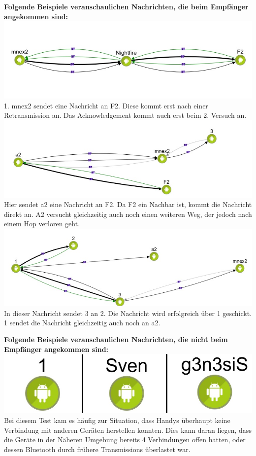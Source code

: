 \textbf{Folgende Beispiele veranschaulichen Nachrichten, die beim
Empfänger angekommen sind:}
\includegraphics{belege/grosstests/Bilder/Grosstest2/Test1Erfolg2.jpg}
1. mnex2 sendet eine Nachricht an F2. Diese kommt erst nach einer
Retransmission an. Das Acknowledgement kommt auch erst beim 2. Versuch
an.
\includegraphics{belege/grosstests/Bilder/Grosstest2/Test1Erfolg1.jpg}
Hier sendet a2 eine Nachricht an F2. Da F2 ein Nachbar ist, kommt die
Nachricht direkt an. A2 versucht gleichzeitig auch noch einen weiteren
Weg, der jedoch nach einem Hop verloren geht.
\includegraphics{belege/grosstests/Bilder/Grosstest2/Test1Erfolg3.jpg}
In dieser Nachricht sendet 3 an 2. Die Nachricht wird erfolgreich über 1
geschickt. 1 sendet die Nachricht gleichzeitig auch noch an a2.

\textbf{Folgende Beispiele veranschaulichen Nachrichten, die nicht beim
Empfänger angekommen sind:}
\includegraphics{belege/grosstests/Bilder/Grosstest2/Test1Misserfolg2.jpg}
Bei diesem Test kam es häufig zur Situation, dass Handys überhaupt keine
Verbindung mit anderen Geräten herstellen konnten. Dies kann daran
liegen, dass die Geräte in der Näheren Umgebung bereits 4 Verbindungen
offen hatten, oder dessen Bluetooth durch frühere Transmissions
überlastet war.

